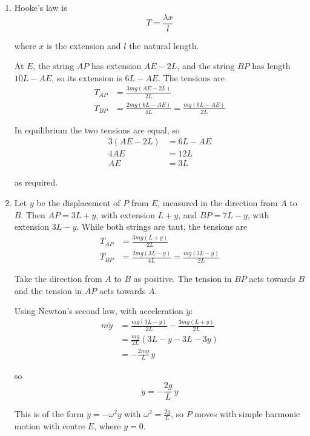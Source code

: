 \documentclass[leqno]{article}
\begin{document}
\begin{enumerate}[
  label=\textbf{\arabic*.},
  leftmargin=*,
  topsep=0pt,
  partopsep=0pt,
  parsep=0pt
]
\vspace*{10pt}

\begin{djsSolution}
\begin{enumerate}[label=\textbf{(\alph*)}, start=1]
\item Hooke's law is
\[
T=\frac{\lambda x}{l}
\]

where \(x\) is the extension and \(l\) the natural length.

At \(E\), the string \(AP\) has extension \(AE-2L\), and the string \(BP\) has length \(10L-AE\), so its extension is \(6L-AE\). The tensions are
\begin{align*}
T_{AP}&=\frac{3mg(AE-2L)}{2L}\\
T_{BP}&=\frac{2mg(6L-AE)}{4L}=\frac{mg(6L-AE)}{2L}
\end{align*}

In equilibrium the two tensions are equal, so
\begin{align*}
3(AE-2L)&=6L-AE\\
4AE&=12L\\
AE&=3L
\end{align*}

as required.

\item Let \(y\) be the displacement of \(P\) from \(E\), measured in the direction from \(A\) to \(B\). Then \(AP=3L+y\), with extension \(L+y\), and \(BP=7L-y\), with extension \(3L-y\). While both strings are taut, the tensions are
\begin{align*}
T_{AP}&=\frac{3mg(L+y)}{2L}\\
T_{BP}&=\frac{2mg(3L-y)}{4L}=\frac{mg(3L-y)}{2L}
\end{align*}

Take the direction from \(A\) to \(B\) as positive. The tension in \(BP\) acts towards \(B\) and the tension in \(AP\) acts towards \(A\).

Using Newton's second law, with acceleration \(\ddot{y}\):
\begin{align*}
m\ddot{y}&=\frac{mg(3L-y)}{2L}-\frac{3mg(L+y)}{2L}\\
&=\frac{mg}{2L}\left(3L-y-3L-3y\right)\\
&=-\frac{2mg}{L}\,y
\end{align*}

so
\[
\ddot{y}=-\frac{2g}{L}\,y
\]

This is of the form \(\ddot{y}=-\omega^2 y\) with \(\omega^2=\frac{2g}{L}\), so \(P\) moves with simple harmonic motion with centre \(E\), where \(y=0\).


\end{enumerate}
\end{djsSolution}
\end{enumerate}
\end{document}
